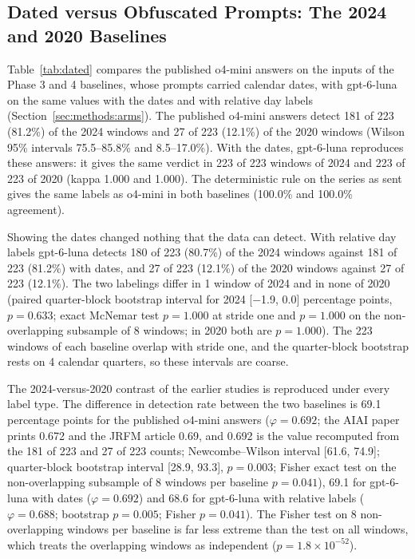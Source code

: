 \subsection{Dated versus Obfuscated Prompts: The 2024 and 2020 Baselines}
\label{sec:results:dated}

Table~\ref{tab:dated} compares the published o4-mini answers on the inputs of the Phase 3 and 4 baselines, whose prompts carried calendar dates, with gpt-6-luna on the same values with the dates and with relative day labels (Section~\ref{sec:methods:arms}).
The published o4-mini answers detect 181 of 223 (81.2\%) of the 2024 windows and 27 of 223 (12.1\%) of the 2020 windows (Wilson 95\% intervals 75.5--85.8\% and 8.5--17.0\%). With the dates, gpt-6-luna reproduces these answers: it gives the same verdict in 223 of 223 windows of 2024 and 223 of 223 of 2020 (kappa 1.000 and 1.000). The deterministic rule on the series as sent gives the same labels as o4-mini in both baselines (100.0\% and 100.0\% agreement).

Showing the dates changed nothing that the data can detect. With relative day labels gpt-6-luna detects 180 of 223 (80.7\%) of the 2024 windows against 181 of 223 (81.2\%) with dates, and 27 of 223 (12.1\%) of the 2020 windows against 27 of 223 (12.1\%). The two labelings differ in 1 window of 2024 and in none of 2020 (paired quarter-block bootstrap interval for 2024 [$-$1.9, 0.0] percentage points, $p=0.633$; exact McNemar test $p=1.000$ at stride one and $p=1.000$ on the non-overlapping subsample of 8 windows; in 2020 both are $p=1.000$). The 223 windows of each baseline overlap with stride one, and the quarter-block bootstrap rests on 4 calendar quarters, so these intervals are coarse.

The 2024-versus-2020 contrast of the earlier studies is reproduced under every label type. The difference in detection rate between the two baselines is 69.1 percentage points for the published o4-mini answers ($\varphi=0.692$; the AIAI paper prints 0.672 and the JRFM article 0.69, and 0.692 is the value recomputed from the 181 of 223 and 27 of 223 counts; Newcombe--Wilson interval [61.6, 74.9]; quarter-block bootstrap interval [28.9, 93.3], $p=0.003$; Fisher exact test on the non-overlapping subsample of 8 windows per baseline $p=0.041$), 69.1 for gpt-6-luna with dates ($\varphi=0.692$) and 68.6 for gpt-6-luna with relative labels ($\varphi=0.688$; bootstrap $p=0.005$; Fisher $p=0.041$). The Fisher test on 8 non-overlapping windows per baseline is far less extreme than the test on all windows, which treats the overlapping windows as independent ($p=1.8\times10^{-52}$).

